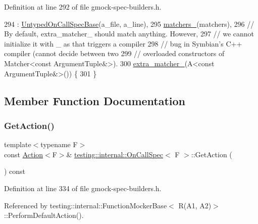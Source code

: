 Definition at line 292 of file gmock-\/spec-\/builders.\+h.


\begin{DoxyCode}
294       : \hyperlink{classtesting_1_1internal_1_1UntypedOnCallSpecBase_afc5da72d536ad61e2d66de87b2b9bc50}{UntypedOnCallSpecBase}(a\_file, a\_line),
295         \hyperlink{classtesting_1_1internal_1_1OnCallSpec_a3938ebe6cb9bc385956358e354a67673}{matchers\_}(matchers),
296         \textcolor{comment}{// By default, extra\_matcher\_ should match anything.  However,}
297         \textcolor{comment}{// we cannot initialize it with \_ as that triggers a compiler}
298         \textcolor{comment}{// bug in Symbian's C++ compiler (cannot decide between two}
299         \textcolor{comment}{// overloaded constructors of Matcher<const ArgumentTuple&>).}
300         \hyperlink{classtesting_1_1internal_1_1OnCallSpec_ab9c4a32626e40be4b40824815128f099}{extra\_matcher\_}(A<const ArgumentTuple&>()) \{
301   \}
\end{DoxyCode}


\subsection{Member Function Documentation}
\mbox{\label{classtesting_1_1internal_1_1OnCallSpec_a3ef8e41380326823fb5b701f3c52cdb6}} 
\subsubsection{\texorpdfstring{Get\+Action()}{GetAction()}}
{\footnotesize\ttfamily template$<$typename F$>$ \\
const \hyperlink{classtesting_1_1Action}{Action}$<$F$>$\& \hyperlink{classtesting_1_1internal_1_1OnCallSpec}{testing\+::internal\+::\+On\+Call\+Spec}$<$ F $>$\+::Get\+Action (\begin{DoxyParamCaption}{ }\end{DoxyParamCaption}) const\hspace{0.3cm}{\ttfamily [inline]}}



Definition at line 334 of file gmock-\/spec-\/builders.\+h.



Referenced by testing\+::internal\+::\+Function\+Mocker\+Base$<$ R(\+A1, A2)$>$\+::\+Perform\+Default\+Action().


